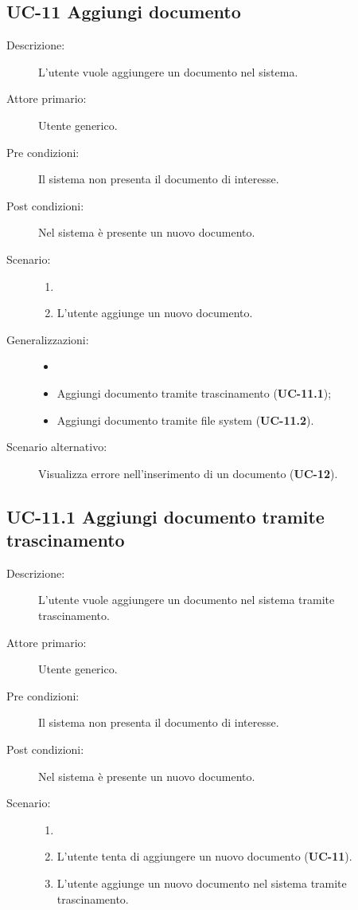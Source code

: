 \subsection{UC-11 Aggiungi documento}
\begin{description}
    \item[Descrizione:] L'utente vuole aggiungere un documento nel sistema.
    \item[Attore primario:] Utente generico.
    \item[Pre condizioni:] Il sistema non presenta il documento di interesse.
    \item[Post condizioni:] Nel sistema è presente un nuovo documento.
    \item[Scenario:]
    \begin{enumerate}
        \item[]
        \item L’utente aggiunge un nuovo documento.
    \end{enumerate}
    \item[Generalizzazioni:] 
    \begin{itemize}
        \item[] 
        \item Aggiungi documento tramite trascinamento (\textbf{UC-11.1});
        \item Aggiungi documento tramite file system (\textbf{UC-11.2}).
    \end{itemize} 
    \item[Scenario alternativo:] Visualizza errore nell'inserimento di un documento (\textbf{UC-12}).
\end{description}

\subsection{UC-11.1 Aggiungi documento tramite trascinamento}
\begin{description}
    \item[Descrizione:] L'utente vuole aggiungere un documento nel sistema tramite trascinamento.
    \item[Attore primario:] Utente generico.
    \item[Pre condizioni:] Il sistema non presenta il documento di interesse.
    \item[Post condizioni:] Nel sistema è presente un nuovo documento.
    \item[Scenario:] 
    \begin{enumerate}
        \item[]
        \item L’utente tenta di aggiungere un nuovo documento (\textbf{UC-11}).
        \item L'utente aggiunge un nuovo documento nel sistema tramite trascinamento.
    \end{enumerate}
\end{description}

